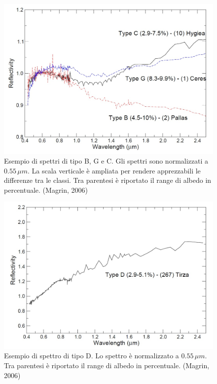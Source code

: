 \documentclass[a4paper,11pt,openright]{book}
\begin{document}
\begin{figure}
    \centering
    \includegraphics[scale=0.3]{figure/spettro_bgc.jpg}
    \caption{Esempio di spettri di tipo B, G e C. Gli spettri sono normalizzati a $0.55\,\mu m$. La scala verticale è ampliata per rendere apprezzabili le differenze tra le classi. Tra parentesi è riportato il range di albedo in percentuale. (Magrin, 2006)}
    \label{spettro_bgc}
\end{figure}

\begin{figure}
    \centering
    \includegraphics[scale=0.3]{figure/spettro_d.jpg}
    \caption{Esempio di spettro di tipo D. Lo spettro è normalizzato a $0.55\,\mu m$. Tra parentesi è riportato il range di albedo in percentuale. (Magrin, 2006)}
    \label{spettro_d}
\end{figure}
\end{document}
